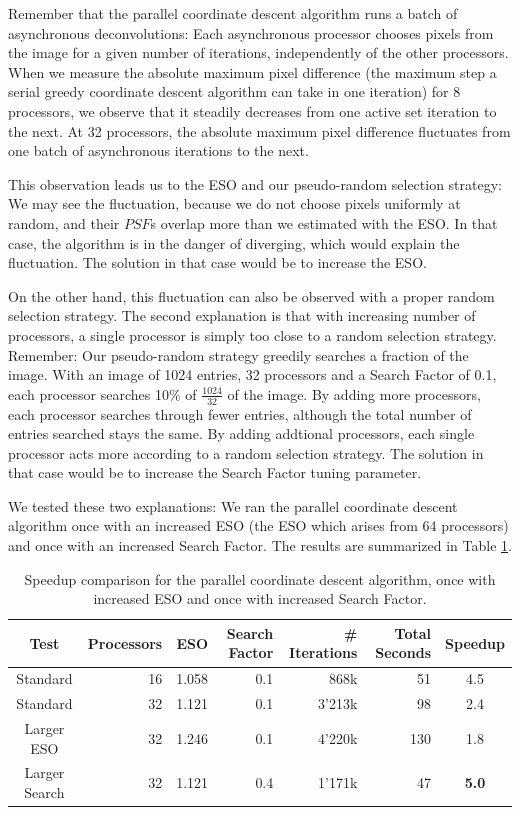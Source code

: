 Remember that the parallel coordinate descent algorithm runs a batch of asynchronous deconvolutions: Each asynchronous processor chooses pixels from the image for a given number of iterations, independently of the other processors. When we measure the absolute maximum pixel difference (the maximum step a serial greedy coordinate descent algorithm can take in one iteration) for 8 processors, we observe that it steadily decreases from one active set iteration to the next. At 32 processors, the absolute maximum pixel difference fluctuates from one batch of asynchronous iterations to the next.

This observation leads us to the ESO and our pseudo-random selection strategy: We may see the fluctuation, because we do not choose pixels uniformly at random, and their $PSF$s overlap more than we estimated with the ESO. In that case, the algorithm is in the danger of diverging, which would explain the fluctuation. The solution in that case would be to increase the ESO.

On the other hand, this fluctuation can also be observed with a proper random selection strategy. The second explanation is that with increasing number of processors, a single processor is simply too close to a random selection strategy. Remember: Our pseudo-random strategy greedily searches a fraction of the image. With an image of 1024 entries, 32 processors and a Search Factor of 0.1, each processor searches 10\% of $\frac{1024}{32}$ of the image. By adding more processors, each processor searches through fewer entries, although the total number of entries searched stays the same. By adding addtional processors, each single processor acts more according to a random selection strategy. The solution in that case would be to increase the Search Factor tuning parameter.

We tested these two explanations: We ran the parallel coordinate descent algorithm once with an increased ESO (the ESO which arises from 64 processors) and once with an increased Search Factor. The results are summarized in Table \ref{pcdm:scalability:table}.

\begin{table} [h]
	\centering
	\begin{tabular}{c | r | r | r | r | r | c}
		Test & Processors &  ESO & Search Factor & \# Iterations & Total Seconds & Speedup\\ \hline \hline
		Standard & 16 & 1.058 & 0.1 &  868k & 51 & 4.5\\\hline
		Standard & 32 & 1.121 & 0.1 & 3'213k & 98 & 2.4\\
		Larger ESO & 32 &  1.246 & 0.1 & 4'220k & 130 & 1.8 \\
		Larger Search & 32 &  1.121 & 0.4 & 1'171k & 47 & \textbf{5.0} \\
	\end{tabular}
	\caption{Speedup comparison for the parallel coordinate descent algorithm, once with increased ESO and once with increased Search Factor.}
	\label{pcdm:scalability:table}
\end{table}

